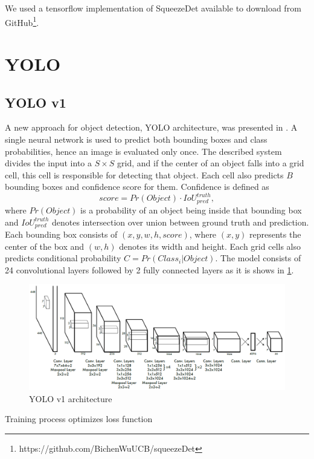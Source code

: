 \documentclass[twoside]{ctuthesis}
\theoremstyle{plain}
\theoremstyle{definition}
\theoremstyle{note}
\begin{document}
We used a tensorflow implementation of SqueezeDet available to download from GitHub\footnote{https://github.com/BichenWuUCB/squeezeDet}.
\section{YOLO}
\label{section:yolo}
\subsection{YOLO v1}
A new approach for object detection, YOLO architecture, was presented in \cite{redmon_divvala_girshick_farhadi_2016}. A single neural network is used to predict both bounding boxes and class probabilities, hence an image is evaluated only once. The described system divides the input into a $S \times S$ grid, and if the center of an object falls into a grid cell, this cell is responsible for detecting that object. Each cell also predicts $B$ bounding boxes and confidence score for them. Confidence is defined as 
\begin{equation}
score = Pr(Object)\cdot IoU^{truth}_{pred},
\end{equation}
where $Pr(Object)$ is a probability of an object being inside that bounding box and $IoU^{truth}_{pred}$ denotes intersection over union between ground truth and prediction. 
Each bounding box consists of $\left(x, y, w, h, score\right)$, where $\left(x, y\right)$ represents the center of the box and $\left(w, h\right)$ denotes its width and height. Each grid cells also predicts conditional probability $C = Pr(Class_i|Object)$.
The model consists of 24 convolutional layers followed by 2 fully connected layers as it is shows in \ref{yolov1}.
\begin{figure}[H]
\caption{YOLO v1 architecture\cite{redmon_divvala_girshick_farhadi_2016}}
\label{yolov1}
\includegraphics[width=\textwidth]{images/used_networks/yolov1.png}
\end{figure}
Training process optimizes loss function
\end{document}
